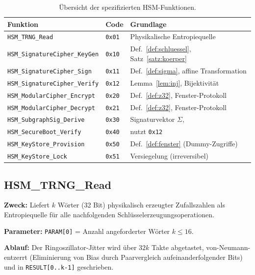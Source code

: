 ﻿\documentclass[a4paper,12pt]{article}
\theoremstyle{definition}
\begin{document}
\begin{table}[h]
	\centering
	\small
	\begin{tabular}{@{}lll@{}}
		\toprule
		Funktion & Code & Grundlage \\
		\midrule
		\texttt{HSM\_TRNG\_Read} & \texttt{0x01} & Physikalische Entropiequelle \\
		\texttt{HSM\_SignatureCipher\_KeyGen} & \texttt{0x10} & Def.~\ref{def:schluessel}, Satz~\ref{satz:koerper} \\
		\texttt{HSM\_SignatureCipher\_Sign} & \texttt{0x11} & Def.~\ref{def:sigma}, affine Transformation \\
		\texttt{HSM\_SignatureCipher\_Verify} & \texttt{0x12} & Lemma~\ref{lem:inj}, Bijektivität \\
		\texttt{HSM\_ModularCipher\_Encrypt} & \texttt{0x20} & Def.~\ref{def:z32}, Fenster-Protokoll \\
		\texttt{HSM\_ModularCipher\_Decrypt} & \texttt{0x21} & Def.~\ref{def:z32}, Fenster-Protokoll \\
		\texttt{HSM\_SubgraphSig\_Derive} & \texttt{0x30} & Signaturvektor $\Sigma$, \cite{Epp26a} \\
		\texttt{HSM\_SecureBoot\_Verify} & \texttt{0x40} & nutzt \texttt{0x12} \\
		\texttt{HSM\_KeyStore\_Provision} & \texttt{0x50} & Def.~\ref{def:fenster} (Dummy-Zugriffe) \\
		\texttt{HSM\_KeyStore\_Lock} & \texttt{0x51} & Versiegelung (irreversibel) \\
		\bottomrule
	\end{tabular}
	\caption{Übersicht der spezifizierten HSM-Funktionen.}
	\label{tab:funktionen}
\end{table}

\subsection{HSM\_TRNG\_Read}

\textbf{Zweck:} Liefert $k$ Wörter (32 Bit) physikalisch erzeugter Zufallszahlen als Entropiequelle für alle nachfolgenden Schlüsselerzeugungsoperationen.

\textbf{Parameter:} \texttt{PARAM[0]} = Anzahl angeforderter Wörter $k \le 16$.

\textbf{Ablauf:} Der Ringoszillator-Jitter wird über $32k$ Takte abgetastet, von-Neumann-entzerrt (Eliminierung von Bias durch Paarvergleich aufeinanderfolgender Bits) und in \texttt{RESULT[0..k-1]} geschrieben.
\end{document}
